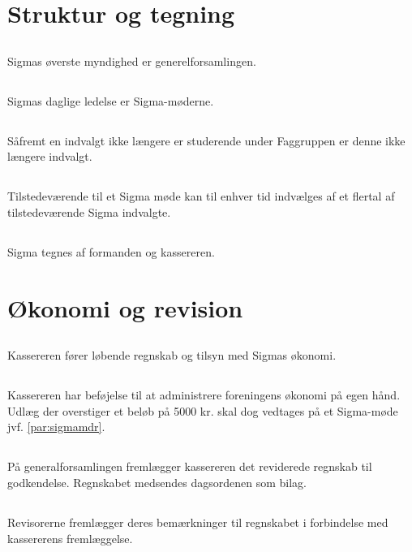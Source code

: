 \documentclass[danish,a4paper,twocolumn]{article}
\begin{document}
\section{Struktur og tegning}
\subsection{}Sigmas øverste myndighed er generelforsamlingen.
\subsection{}Sigmas daglige ledelse er Sigma-møderne.
\subsection{}Såfremt en indvalgt ikke længere er studerende under Faggruppen er denne ikke længere indvalgt.
\subsection{}Tilstedeværende til et Sigma møde kan til enhver tid indvælges af et flertal af tilstedeværende Sigma indvalgte.
\subsection{}Sigma tegnes af formanden og kassereren.

\section{Økonomi og revision}
\subsection{}Kassereren fører løbende regnskab og tilsyn med Sigmas økonomi.
\subsection{}Kassereren har beføjelse til at administrere
foreningens økonomi på egen hånd. Udlæg der overstiger et beløb på 5000
kr. skal dog vedtages på et Sigma-møde jvf. \ref{par:sigmamdr}.

\subsection{}På generalforsamlingen fremlægger kassereren det reviderede regnskab til godkendelse. Regnskabet medsendes dagsordenen som bilag.
\subsection{}Revisorerne fremlægger deres bemærkninger til regnskabet i forbindelse med kassererens fremlæggelse.
\end{document}
